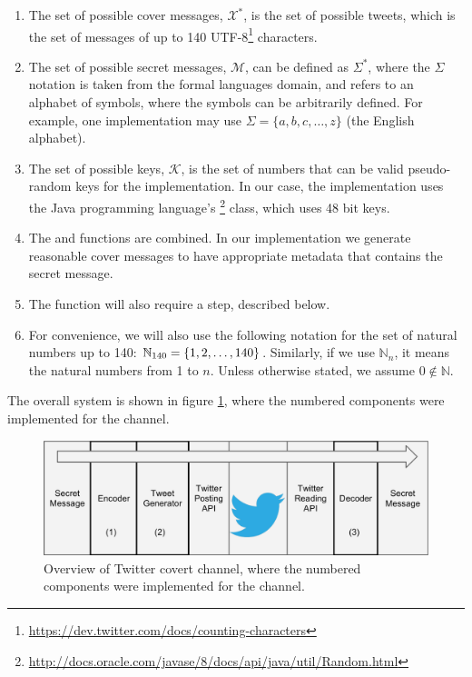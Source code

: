 \begin{enumerate}
  \item The set of possible cover messages, $\mathcal{X}^*$, is the set of
  possible tweets, which is the set of messages of up to 140
  UTF-8\footnote{\url{https://dev.twitter.com/docs/counting-characters}}
  characters.
  \item The set of possible secret messages, $\mathcal{M}$, can be defined as
  $\Sigma^*$, where the $\Sigma$ notation is taken from the formal languages
  domain, and refers to an alphabet of symbols, where the symbols can be
  arbitrarily defined.  For example, one implementation may use $\Sigma = \{a,
  b, c, \ldots, z\}$ (the English alphabet).
  \item The set of possible keys, $\mathcal{K}$, is the set of numbers that can
  be valid pseudo-random keys for the implementation.  In our case,
  the implementation uses the Java programming language's
  \footnote{\url{http://docs.oracle.com/javase/8/docs/api/java/util/Random.html}}
  class, which uses 48 bit keys.
  \item The  and  functions are combined.
  In our implementation we generate reasonable cover messages to have appropriate
  metadata that contains the secret message.
  \item The  function will also require a  step,
  described below.
  \item For convenience, we will also use the following notation for the set of
  natural numbers up to 140: $\mathbb{N}_{140} = \{1, 2, \ldots, 140\}$.  Similarly, if
  we use $\mathbb{N}_n$, it means the natural numbers from 1 to $n$.  Unless
  otherwise stated, we assume $0 \not\in \mathbb{N}$.
\end{enumerate}

The overall system is shown in figure \ref{fig:twittercc}, where the numbered
components were implemented for the channel.

\begin{figure}
\centering
\includegraphics[width=\columnwidth]{twittercc.eps}
\caption{Overview of Twitter covert channel, where the numbered
components were implemented for the channel.}
\label{fig:twittercc}
\end{figure}

